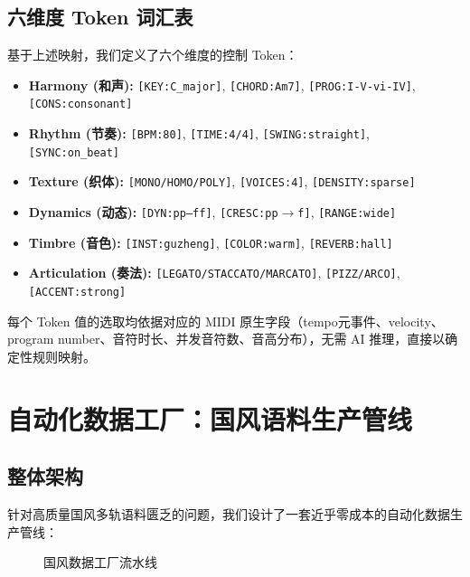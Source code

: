 \documentclass[12pt,a4paper]{article}
\begin{document}
\subsection{六维度 Token 词汇表}

基于上述映射，我们定义了六个维度的控制 Token：

\begin{itemize}
\item \textbf{Harmony (和声):} \texttt{[KEY:C\_major]}, \texttt{[CHORD:Am7]}, \texttt{[PROG:I-V-vi-IV]}, \texttt{[CONS:consonant]}
\item \textbf{Rhythm (节奏):} \texttt{[BPM:80]}, \texttt{[TIME:4/4]}, \texttt{[SWING:straight]}, \texttt{[SYNC:on\_beat]}
\item \textbf{Texture (织体):} \texttt{[MONO/HOMO/POLY]}, \texttt{[VOICES:4]}, \texttt{[DENSITY:sparse]}
\item \textbf{Dynamics (动态):} \texttt{[DYN:pp--ff]}, \texttt{[CRESC:pp$\rightarrow$f]}, \texttt{[RANGE:wide]}
\item \textbf{Timbre (音色):} \texttt{[INST:guzheng]}, \texttt{[COLOR:warm]}, \texttt{[REVERB:hall]}
\item \textbf{Articulation (奏法):} \texttt{[LEGATO/STACCATO/MARCATO]}, \texttt{[PIZZ/ARCO]}, \texttt{[ACCENT:strong]}
\end{itemize}

每个 Token 值的选取均依据对应的 MIDI 原生字段（tempo元事件、velocity、program number、音符时长、并发音符数、音高分布），无需 AI 推理，直接以确定性规则映射。

\section{自动化数据工厂：国风语料生产管线}

\subsection{整体架构}

针对高质量国风多轨语料匮乏的问题，我们设计了一套近乎零成本的自动化数据生产管线：

\begin{figure}[H]
\centering
{}
\caption{国风数据工厂流水线}
\label{fig:factory}
\end{figure}
\end{document}
